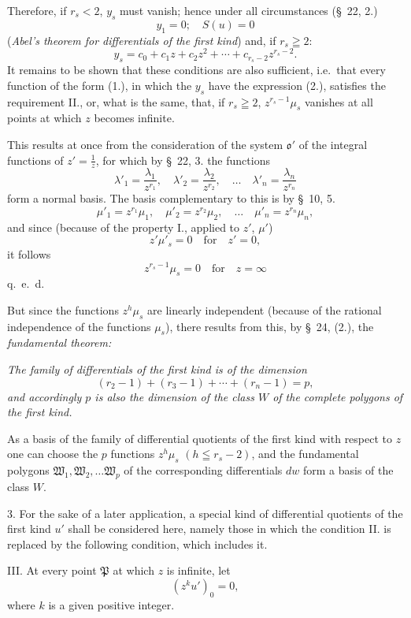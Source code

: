 \documentclass{article}
\begin{document}
Therefore, if $r_{s} < 2$, $y_{s}$ must vanish; hence under all circumstances (§~22, 2.)
\[ y_{1} = 0; \quad S(u) = 0 \]
(\emph{Abel's theorem for differentials of the first kind}) and, if $r_{s} \geqq 2$:
\[ y_{s} = c_{0} + c_{1}z + c_{2}z^{2} + \cdots + c_{r_{s}-2}z^{r_{s}-2}. \tag{2.} \]
It remains to be shown that these conditions are also sufficient, i.e.\ that every function of the form (1.), in which the $y_{s}$ have the expression (2.), satisfies the requirement II., or, what is the same, that, if $r_{s} \geqq 2$, $z^{r_{s}-1}\mu_{s}$ vanishes at all points at which $z$ becomes infinite.

This results at once from the consideration of the system $\mathfrak{o}'$ of the integral functions of $z' = \frac{1}{z}$, for which by §~22, 3. the functions
\[ \lambda'_{1} = \frac{\lambda_{1}}{z^{r_{1}}}, \quad \lambda'_{2} = \frac{\lambda_{2}}{z^{r_{2}}}, \quad \ldots \quad \lambda'_{n} = \frac{\lambda_{n}}{z^{r_{n}}} \]
form a normal basis. The basis complementary to this is by §~10, 5.
\[ \mu'_{1} = z^{r_{1}}\mu_{1}, \quad \mu'_{2} = z^{r_{2}}\mu_{2}, \quad \ldots \quad \mu'_{n} = z^{r_{n}}\mu_{n}, \]
and since (because of the property I., applied to $z'$, $\mu'$)
\[ z'\mu'_{s} = 0 \quad \text{for} \quad z' = 0, \]
it follows
\[ z^{r_{s}-1}\mu_{s} = 0 \quad \text{for} \quad z = \infty \]
q.\ e.\ d.

But since the functions $z^{h}\mu_{s}$ are linearly independent (because of the rational independence of the functions $\mu_{s}$), there results from this, by §~24, (2.), the \emph{fundamental theorem:}

\emph{The family of differentials of the first kind is of the dimension}
\[ (r_{2}-1) + (r_{3}-1) + \cdots + (r_{n}-1) = p, \]
\emph{and accordingly $p$ is also the dimension of the class $W$ of the complete polygons of the first kind.}

As a basis of the family of differential quotients of the first kind with respect to $z$ one can choose the $p$ functions $z^{h}\mu_{s}$ $(h \leqq r_{s}-2)$, and the fundamental polygons $\mathfrak{W}_{1}, \mathfrak{W}_{2}, \ldots \mathfrak{W}_{p}$ of the corresponding differentials $dw$ form a basis of the class $W$.

3. For the sake of a later application, a special kind of differential quotients of the first kind $u'$ shall be considered here, namely those in which the condition II. is replaced by the following condition, which includes it.

III. At every point $\mathfrak{P}$ at which $z$ is infinite, let
\[ (z^{k}u')_{0} = 0, \]
where $k$ is a given positive integer.
\end{document}
